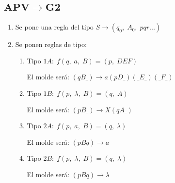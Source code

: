 \documentclass[12pt, twoside, openright]{report} %
\begin{document}
\subsection{$\boldsymbol{APV \rightarrow G2}$}
\begin{enumerate}
	\item Se pone una regla del tipo $S \rightarrow (q_0, \; A_0, \; pqr...)$
	\item Se ponen reglas de tipo:
	\begin{enumerate}
		\item Tipo $1A: \; f(q, \; a, \; B) = (p, \; DEF)$

		El molde será: $(qB\_) \rightarrow a(pD\_)(\_E\_)(\_F\_)$

		\item Tipo $1B: \; f(p, \; \lambda, \; B) = (q, \; A)$

		El molde será: $(pB\_) \rightarrow X(qA\_)$

		\item Tipo $2A: \; f(p, \; a, \; B) = (q, \; \lambda)$

		El molde será: $(pBq) \rightarrow a$

		\item Tipo $2B: \; f(p, \; \lambda, \; B) = (q, \; \lambda)$

		El molde será: $(pBq) \rightarrow \lambda$


	\end{enumerate}
\end{enumerate}
\pagebreak
\end{document}
